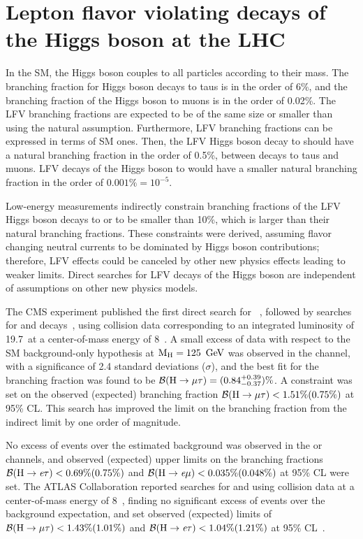 


\section{Lepton flavor violating decays of the Higgs boson at the LHC}

In the SM, the Higgs boson couples to all particles according to their mass. The branching fraction for Higgs boson decays to taus is in the order of 6\%, and the branching fraction of the Higgs boson to muons is in the order of 0.02\%. The LFV branching fractions are expected to be of the same size or smaller than \BHij using the natural assumption. Furthermore, LFV branching fractions \BHij can be expressed in terms of SM ones. Then, the LFV Higgs boson decay to \mutau should have a natural branching fraction in the order of 0.5\%, between decays to taus and muons. LFV decays of the Higgs boson to \etau would have a smaller natural branching fraction in the order of $0.001\% = 10^{-5}$.

Low-energy measurements indirectly constrain branching fractions of the LFV Higgs boson decays to \mutau or \etau to be smaller than 10\%, which is larger than their natural branching fractions. These constraints were derived, assuming flavor changing neutral currents to be dominated by Higgs boson contributions; therefore, LFV effects could be canceled by other new physics effects leading to weaker limits. Direct searches for LFV decays of the Higgs boson are independent of assumptions on other new physics models.

The CMS experiment published the first direct search for \Hmt~\cite{Khachatryan:2015kon}, followed by searches for \Het and \Hem decays~\cite{Khachatryan:2016rke}, using \pp collision data corresponding to an integrated luminosity of 19.7~\fb at a center-of-mass energy of 8~\TeV. A small excess of data with respect to the SM background-only hypothesis at $\text{M}_{\text{H}} = 125~\,\text{Ge\hspace{-.08em}V}$ was observed in the \Hmt channel, with a significance of 2.4 standard deviations ($\sigma$), and the best fit for the branching fraction was found to be $\mathcal{B}(\text{H} \to \mu \tau) = (0.84^{+0.39}_{-0.37})\%$. A constraint was set on the observed (expected) branching fraction $\mathcal{B}(\text{H} \to \mu \tau) < 1.51\% (0.75\%)$ at 95\% CL. This search has improved the limit on the branching fraction \BHmt from the indirect limit by one order of magnitude.

No excess of events over the estimated background was observed in the \Het or \Hem channels, and observed (expected) upper limits on the branching fractions $\mathcal{B}(\text{H} \to \textit{e} \tau) < 0.69\% (0.75\%)$ and $\mathcal{B}(\text{H} \to \textit{e} \mu) < 0.035\% (0.048\%)$ at 95\% CL were set. The ATLAS Collaboration reported searches for \Het and \Hmt using \pp collision data at a center-of-mass energy of 8~\TeV, finding no significant excess of events over the background expectation, and set observed (expected) limits of $\mathcal{B}(\text{H} \to \mu \tau) < 1.43\% (1.01\%)$ and $\mathcal{B}(\text{H} \to \textit{e} \tau) < 1.04\% (1.21\%)$ at 95\% CL~\cite{Aad:2016blu, Aad:2015gha}.

